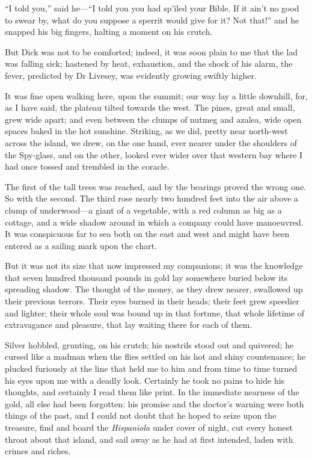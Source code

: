 \enquote{I told you,} said he---\enquote{I told you you had sp’iled your Bible. If it ain’t no good to swear by, what do you suppose a sperrit would give for it? Not that!} and he snapped his big fingers, halting a moment on his crutch.

But Dick was not to be comforted; indeed, it was soon plain to me that the lad was falling sick; hastened by heat, exhaustion, and the shock of his alarm, the fever, predicted by Dr Livesey, was evidently growing swiftly higher.

It was fine open walking here, upon the summit; our way lay a little downhill, for, as I have said, the plateau tilted towards the west. The pines, great and small, grew wide apart; and even between the clumps of nutmeg and azalea, wide open spaces baked in the hot sunshine. Striking, as we did, pretty near north-west across the island, we drew, on the one hand, ever nearer under the shoulders of the Spy-glass, and on the other, looked ever wider over that western bay where I had once tossed and trembled in the coracle.

The first of the tall trees was reached, and by the bearings proved the wrong one. So with the second. The third rose nearly two hundred feet into the air above a clump of underwood---a giant of a vegetable, with a red column as big as a cottage, and a wide shadow around in which a company could have manoeuvred. It was conspicuous far to sea both on the east and west and might have been entered as a sailing mark upon the chart.

But it was not its size that now impressed my companions; it was the knowledge that seven hundred thousand pounds in gold lay somewhere buried below its spreading shadow. The thought of the money, as they drew nearer, swallowed up their previous terrors. Their eyes burned in their heads; their feet grew speedier and lighter; their whole soul was bound up in that fortune, that whole lifetime of extravagance and pleasure, that lay waiting there for each of them.

Silver hobbled, grunting, on his crutch; his nostrils stood out and quivered; he cursed like a madman when the flies settled on his hot and shiny countenance; he plucked furiously at the line that held me to him and from time to time turned his eyes upon me with a deadly look. Certainly he took no pains to hide his thoughts, and certainly I read them like print. In the immediate nearness of the gold, all else had been forgotten: his promise and the doctor’s warning were both things of the past, and I could not doubt that he hoped to seize upon the treasure, find and board the \textit{Hispaniola} under cover of night, cut every honest throat about that island, and sail away as he had at first intended, laden with crimes and riches.

